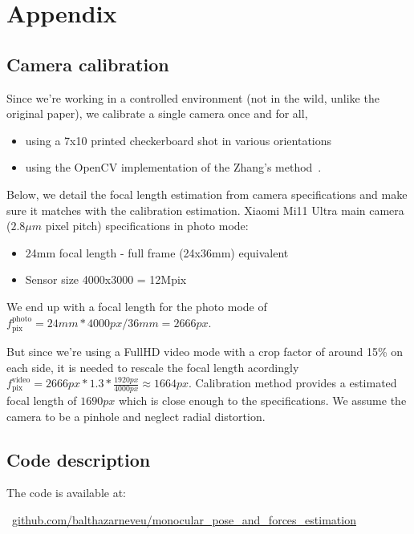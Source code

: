\section{Appendix}
\subsection{Camera calibration}
\label{app:cam_calib}
Since we're working in a controlled environment (not in the wild, unlike the original paper), we calibrate a single camera once and for all,
\begin{itemize}
    \item using a 7x10 printed checkerboard shot in various orientations
    \item  using the OpenCV implementation of the Zhang's method~\cite{Zhang00calib}.
\end{itemize}

Below, we detail the focal length estimation from camera specifications
and make sure it matches with the calibration estimation.
Xiaomi Mi11 Ultra main camera ($2.8\mu m$ pixel pitch) specifications in photo mode:
\begin{itemize}
    \item 24mm focal length - full frame (24x36mm) equivalent
    \item Sensor size 4000x3000 = 12Mpix
\end{itemize}
We end up with a focal length for the photo mode of $f_{\text{pix}}^{\text{photo}}  = 24mm * 4000px / 36mm = 2666px$.

But since we're using a FullHD video mode with a crop factor of around 15\% on each side,
it is needed to rescale the focal length acordingly $f_{\text{pix}}^{\text{video}} = 2666px * 1.3 * \frac{1920px}{4000px} \approx 1664px$.
Calibration method provides a estimated focal length of $1690px$ which is close enough to the specifications.
We assume the camera to be a pinhole and neglect radial distortion.


\subsection{Code description}
\label{app:code}
The code is available at:

~\href{https://github.com/balthazarneveu/monocular_pose_and_forces_estimation}{github.com/balthazarneveu/monocular\_pose\_and\_forces\_estimation}

